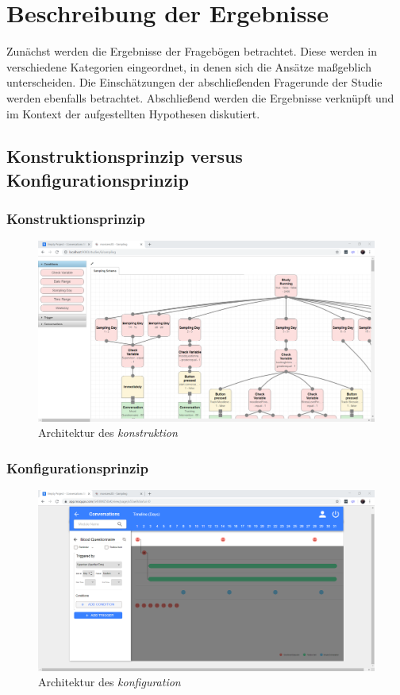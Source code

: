 \section{Beschreibung der Ergebnisse}

Zunächst werden die Ergebnisse der Fragebögen betrachtet. Diese werden in verschiedene Kategorien eingeordnet, in denen sich die Ansätze maßgeblich unterscheiden. Die Einschätzungen der abschließenden Fragerunde der Studie werden ebenfalls betrachtet. Abschließend werden die Ergebnisse verknüpft und im Kontext der aufgestellten Hypothesen diskutiert. 

\subsection{Konstruktionsprinzip versus Konfigurationsprinzip}

\subsubsection{Konstruktionsprinzip}
\begin{figure}[h]
\centering
\includegraphics[width=1\textwidth]{pictures/konstruktion}
\caption{Architektur des \emph{konstruktion}}
\label{konstruktion}
\end{figure}

\subsubsection{Konfigurationsprinzip}

\begin{figure}[h]
\centering
\includegraphics[width=1\textwidth]{pictures/konfiguration}
\caption{Architektur des \emph{konfiguration}}
\label{konfiguration}
\end{figure}


